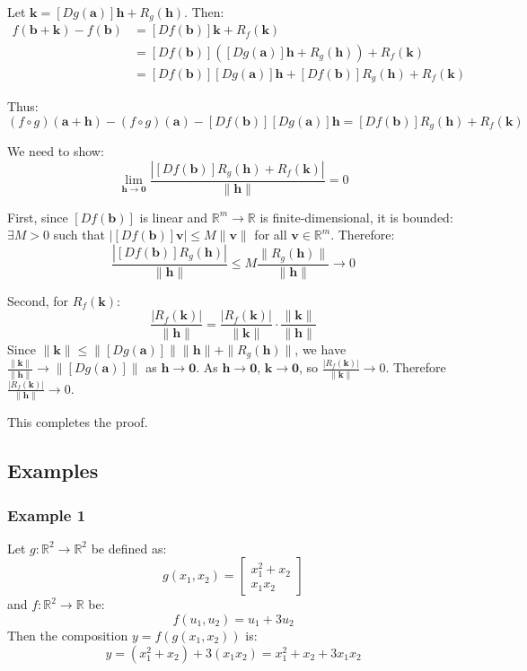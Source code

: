 \begin{notechapter}
Let $\mathbf{k} = [Dg(\mathbf{a})]\mathbf{h} + R_g(\mathbf{h})$. Then:
\begin{align*}
    f(\mathbf{b} + \mathbf{k}) - f(\mathbf{b}) 
    &= [Df(\mathbf{b})]\mathbf{k} + R_f(\mathbf{k}) \\
    &= [Df(\mathbf{b})]\left([Dg(\mathbf{a})]\mathbf{h} + R_g(\mathbf{h})\right) + R_f(\mathbf{k}) \\
&= [Df(\mathbf{b})][Dg(\mathbf{a})]\mathbf{h} + [Df(\mathbf{b})]R_g(\mathbf{h})
+ R_f(\mathbf{k})
\end{align*}

Thus:
\[
(f \circ g)(\mathbf{a} + \mathbf{h}) - (f \circ g)(\mathbf{a}) - [Df(\mathbf{b})][Dg(\mathbf{a})]\mathbf{h} = [Df(\mathbf{b})]R_g(\mathbf{h}) + R_f(\mathbf{k})
\]

We need to show:
\[
\lim_{\mathbf{h} \to \mathbf{0}} \frac{|[Df(\mathbf{b})]R_g(\mathbf{h}) + R_f(\mathbf{k})|}{\|\mathbf{h}\|} = 0
\]

First, since $[Df(\mathbf{b})]$ is linear and $\mathbb{R}^m \to \mathbb{R}$ is
finite-dimensional, it is bounded: $\exists M > 0$ such that
$|[Df(\mathbf{b})]\mathbf{v}| \leq M\|\mathbf{v}\|$ for all $\mathbf{v} \in
\mathbb{R}^m$. Therefore:
\[
\frac{|[Df(\mathbf{b})]R_g(\mathbf{h})|}{\|\mathbf{h}\|} \leq M \frac{\|R_g(\mathbf{h})\|}{\|\mathbf{h}\|} \to 0
\]

Second, for $R_f(\mathbf{k})$:
\[
\frac{|R_f(\mathbf{k})|}{\|\mathbf{h}\|} = \frac{|R_f(\mathbf{k})|}{\|\mathbf{k}\|} \cdot \frac{\|\mathbf{k}\|}{\|\mathbf{h}\|}
\]
Since $\|\mathbf{k}\| \leq \|[Dg(\mathbf{a})]\|\|\mathbf{h}\| +
\|R_g(\mathbf{h})\|$, we have $\frac{\|\mathbf{k}\|}{\|\mathbf{h}\|} \to
\|[Dg(\mathbf{a})]\|$ as $\mathbf{h} \to \mathbf{0}$. As $\mathbf{h} \to
\mathbf{0}$, $\mathbf{k} \to \mathbf{0}$, so
$\frac{|R_f(\mathbf{k})|}{\|\mathbf{k}\|} \to 0$. Therefore
$\frac{|R_f(\mathbf{k})|}{\|\mathbf{h}\|} \to 0$.

This completes the proof.

\subsection{Examples}
\subsubsection{Example 1}
Let $g: \mathbb{R}^2 \to \mathbb{R}^2$ be defined as:
\[
g(x_1, x_2) = \begin{bmatrix} x_1^2 + x_2 \\ x_1 x_2 \end{bmatrix}
\]
and $f: \mathbb{R}^2 \to \mathbb{R}$ be:
\[
f(u_1, u_2) = u_1 + 3u_2
\]
Then the composition $y = f(g(x_1, x_2))$ is:
\[
y = (x_1^2 + x_2) + 3(x_1 x_2) = x_1^2 + x_2 + 3x_1 x_2
\]


\end{notechapter}
